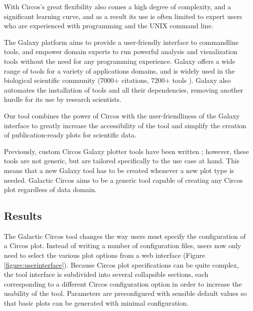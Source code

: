 With Circos's great flexibility also comes a high degree of complexity, and a significant learning curve, and as a result its use is often limited to expert users who are experienced with programming and the UNIX command line.

The Galaxy platform \cite{afgan2018galaxy} aims to provide a user-friendly interface to commandline tools, and empower domain experts to run powerful analysis and visualization tools without the need for any programming experience. Galaxy offers a wide range of tools for a variety of applications domains, and is widely used in the biological scientific community (7000+ citations, 7200+ tools \cite{galaxycitations,galaxytoolshed}). Galaxy also automates the installation of tools and all their dependencies, removing another hurdle for its use by research scientists.

Our tool combines the power of Circos with the user-friendliness of the Galaxy interface to greatly increase the accessibility of the tool and simplify the creation of publication-ready plots for scientific data.

Previously, custom Circos Galaxy plotter tools have been written \cite{hiltemann2014cgtag}; however, these tools are not generic, but are tailored specifically to the use case at hand. This means that a new Galaxy tool has to be created whenever a new plot type is needed. Galactic Circos aims to be a generic tool capable of creating any Circos plot regardless of data domain.

\subsection*{Results}
The Galactic Circos tool changes the way users must specify the configuration of a Circos plot. Instead of writing a number of configuration files, users now only need to select the various plot options from a web interface (Figure \ref{figure:userinterface}). Because Circos plot specifications can be quite complex, the tool interface is subdivided into several collapsible sections, each corresponding to a different Circos configuration option in order to increase the usability of the tool. Parameters are preconfigured with sensible default values so that basic plots can be generated with minimal configuration.

